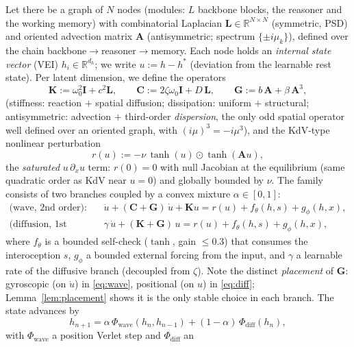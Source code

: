 \documentclass{article}
\begin{document}
Let there be a graph of $N$ nodes (modules: $L$ backbone blocks, the reasoner
and the working memory) with combinatorial Laplacian
$\mathbf{L}\in\mathbb{R}^{N\times N}$ (symmetric, PSD) and oriented advection
matrix $\mathbf{A}$ (antisymmetric; spectrum $\{\pm i\mu_k\}$), defined over the
chain backbone${}\to{}$reasoner${}\to{}$memory. Each node holds an
\emph{internal state vector} (VEI) $h_i\in\mathbb{R}^{d_h}$; we write
$u:=h-h^\ast$ (deviation from the learnable rest state). Per latent dimension, we
define the operators
\begin{equation}
\mathbf{K}:=\omega_0^2\mathbf{I}+c^2\mathbf{L},\qquad
\mathbf{C}:=2\zeta\omega_0\mathbf{I}+D\,\mathbf{L},\qquad
\mathbf{G}:=b\,\mathbf{A}+\beta\,\mathbf{A}^3,
\end{equation}
(stiffness: reaction $+$ spatial diffusion; dissipation: uniform $+$ structural;
antisymmetric: advection $+$ third-order \emph{dispersion}, the only odd spatial
operator well defined over an oriented graph, with $(i\mu)^3=-i\mu^3$), and the
KdV-type nonlinear perturbation
\begin{equation}
r(u):=-\nu\,\tanh(u)\odot\tanh(\mathbf{A}u),
\end{equation}
the \emph{saturated} $u\,\partial_x u$ term: $r(0)=0$ with null Jacobian at the
equilibrium (same quadratic order as KdV near $u=0$) and globally bounded by
$\nu$. The family consists of two branches coupled by a convex mixture
$\alpha\in[0,1]$:
\begin{align}
\text{(wave, 2nd order):}\quad &
\ddot u + (\mathbf{C}+\mathbf{G})\,\dot u + \mathbf{K}u
   = r(u) + f_\theta(h,s) + g_\phi(h,x),
\label{eq:wave}\\
\text{(diffusion, 1st order):}\quad &
\gamma\,\dot u + (\mathbf{K}+\mathbf{G})\,u
   = r(u) + f_\theta(h,s) + g_\phi(h,x),
\label{eq:diff}
\end{align}
where $f_\theta$ is a bounded self-check ($\tanh$, gain $\le 0.3$) that consumes
the interoception $s$, $g_\phi$ a bounded external forcing from the input, and
$\gamma$ a learnable rate of the diffusive branch (decoupled from $\zeta$). Note
the distinct \emph{placement} of $\mathbf{G}$: gyroscopic (on $\dot u$) in
\eqref{eq:wave}, positional (on $u$) in \eqref{eq:diff};
Lemma~\ref{lem:placement} shows it is the only stable choice in each branch. The
state advances by
\begin{equation}
h_{n+1}=\alpha\, \Phi_{\mathrm{wave}}(h_n,h_{n-1})
        +(1-\alpha)\,\Phi_{\mathrm{diff}}(h_n),
\end{equation}
with $\Phi_{\mathrm{wave}}$ a position Verlet step and $\Phi_{\mathrm{diff}}$ an
\end{document}
